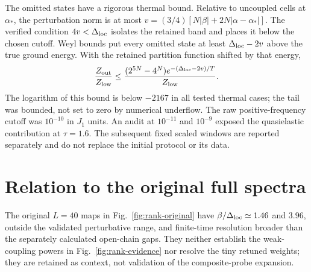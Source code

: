 The omitted states have a rigorous thermal bound. Relative to uncoupled
cells at $\alpha_*$, the perturbation norm is at most
$v=(3/4)[N|\beta|+2N|\alpha-\alpha_*|]$.
The verified condition $4v<\Delta_{\mathrm{loc}}$ isolates the retained band and places
it below the chosen cutoff. Weyl bounds put every omitted state at least
$\Delta_{\mathrm{loc}}-2v$ above the true ground energy. With the retained partition
function shifted by that energy,
\begin{equation}
 \frac{Z_{\rm out}}{Z_{\rm low}}
 \le \frac{(2^{5N}-4^N)e^{-(\Delta_{\mathrm{loc}}-2v)/T}}{Z_{\rm low}}.
\end{equation}
The logarithm of this bound is below $-2167$ in all tested thermal cases;
the tail was bounded, not set to zero by numerical underflow.
The raw positive-frequency cutoff was $10^{-10}$ in $J_1$ units.
An audit at $10^{-11}$ and $10^{-9}$ exposed the quasielastic contribution
at $\tau=1.6$. The subsequent fixed scaled windows are reported separately
and do not replace the initial protocol or its data.

\section{Relation to the original full spectra}

The original $L=40$ maps in Fig.~\ref{fig:rank-original} have
$\beta/\Delta_{\mathrm{loc}}\simeq1.46$ and $3.96$, outside the validated perturbative
range, and finite-time resolution broader than the separately calculated
open-chain gaps. They neither establish the weak-coupling powers in
Fig.~\ref{fig:rank-evidence} nor resolve the tiny retuned weights; they
are retained as context, not validation of the composite-probe expansion.

